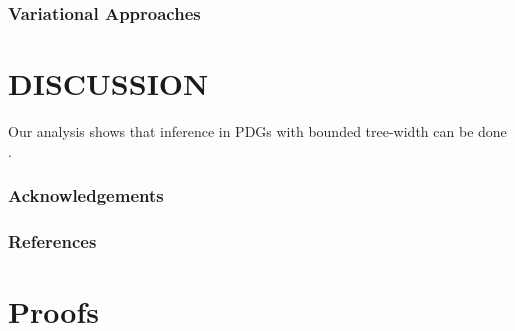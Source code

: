 \documentclass[twoside]{article}
\begin{document}
\subsubsection{Variational Approaches}






\section{DISCUSSION}

Our analysis shows that inference in PDGs with bounded tree-width can be done .






\subsubsection*{Acknowledgements}

\subsubsection*{References}
\printbibliography


\clearpage
\onecolumn
\appendix
\section{Proofs}
\end{document}
